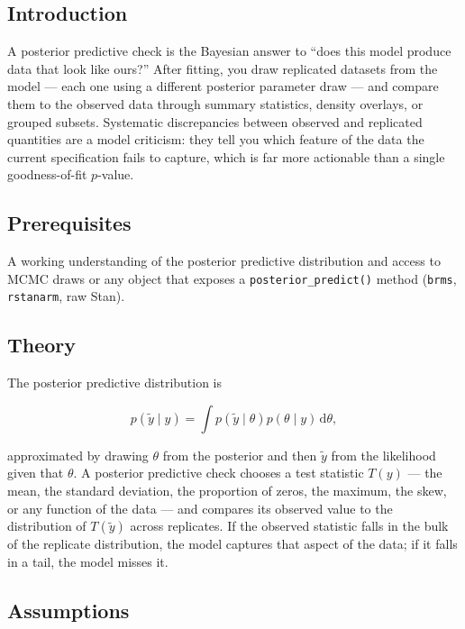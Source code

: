 \documentclass[
]{article}
\author{}
\date{\vspace{-2.5em}}
\begin{document}
\subsection{Introduction}\label{introduction}

A posterior predictive check is the Bayesian answer to ``does this model
produce data that look like ours?'' After fitting, you draw replicated
datasets from the model --- each one using a different posterior
parameter draw --- and compare them to the observed data through summary
statistics, density overlays, or grouped subsets. Systematic
discrepancies between observed and replicated quantities are a model
criticism: they tell you which feature of the data the current
specification fails to capture, which is far more actionable than a
single goodness-of-fit \(p\)-value.

\subsection{Prerequisites}\label{prerequisites}

A working understanding of the posterior predictive distribution and
access to MCMC draws or any object that exposes a
\texttt{posterior\_predict()} method (\texttt{brms}, \texttt{rstanarm},
raw Stan).

\subsection{Theory}\label{theory}

The posterior predictive distribution is

\[p(\tilde y \mid y) = \int p(\tilde y \mid \theta) p(\theta \mid y) \, \mathrm d \theta,\]

approximated by drawing \(\theta\) from the posterior and then
\(\tilde y\) from the likelihood given that \(\theta\). A posterior
predictive check chooses a test statistic \(T(y)\) --- the mean, the
standard deviation, the proportion of zeros, the maximum, the skew, or
any function of the data --- and compares its observed value to the
distribution of \(T(\tilde y)\) across replicates. If the observed
statistic falls in the bulk of the replicate distribution, the model
captures that aspect of the data; if it falls in a tail, the model
misses it.

\subsection{Assumptions}\label{assumptions}
\end{document}
